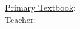\documentclass[11 pt, twoside]{article}
\begin{document}
\title{}
\author{Avery Karlin}
\date{}
\newcommand{\textbook}{}
\newcommand{\teacher}{}

\maketitle
\newpage
\tableofcontents
\vspace{11pt}
\noindent
\underline{Primary Textbook}: \textbook\\
\underline{Teacher}: \teacher
\newpage
\end{document}
